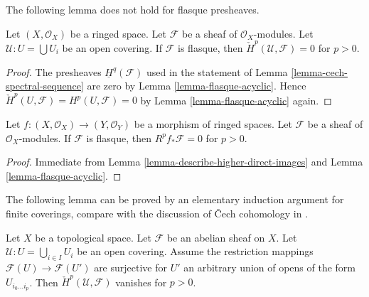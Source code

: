 \noindent
The following lemma does not hold for flasque presheaves.

\begin{lemma}
\label{lemma-flasque-acyclic-cech}
Let $(X, \mathcal{O}_X)$ be a ringed space.
Let $\mathcal{F}$ be a sheaf of $\mathcal{O}_X$-modules.
Let $\mathcal{U} : U = \bigcup U_i$ be an open covering.
If $\mathcal{F}$ is flasque, then
$\check{H}^p(\mathcal{U}, \mathcal{F}) = 0$ for $p > 0$.
\end{lemma}

\begin{proof}
The presheaves $\underline{H}^q(\mathcal{F})$ used in the statement
of Lemma \ref{lemma-cech-spectral-sequence} are zero by
Lemma \ref{lemma-flasque-acyclic}.
Hence $\check{H}^p(U, \mathcal{F}) = H^p(U, \mathcal{F}) = 0$
by Lemma \ref{lemma-flasque-acyclic} again.
\end{proof}

\begin{lemma}
\label{lemma-flasque-acyclic-pushforward}
Let $f : (X, \mathcal{O}_X) \to (Y, \mathcal{O}_Y)$ be a morphism
of ringed spaces. Let $\mathcal{F}$ be a sheaf of $\mathcal{O}_X$-modules.
If $\mathcal{F}$ is flasque, then $R^pf_*\mathcal{F} = 0$ for $p > 0$.
\end{lemma}

\begin{proof}
Immediate from 
Lemma \ref{lemma-describe-higher-direct-images} and
Lemma \ref{lemma-flasque-acyclic}.
\end{proof}

\noindent
The following lemma can be proved by an elementary induction
argument for finite coverings, compare with the discussion
of {\v C}ech cohomology in \cite{FOAG}.

\begin{lemma}
\label{lemma-vanishing-ravi}
Let $X$ be a topological space. Let $\mathcal{F}$ be an abelian sheaf
on $X$. Let $\mathcal{U} : U = \bigcup_{i \in I} U_i$ be an
open covering. Assume the restriction mappings
$\mathcal{F}(U) \to \mathcal{F}(U')$ are surjective
for $U'$ an arbitrary union of opens of the form $U_{i_0 \ldots i_p}$.
Then $\check{H}^p(\mathcal{U}, \mathcal{F})$
vanishes for $p > 0$.
\end{lemma}

